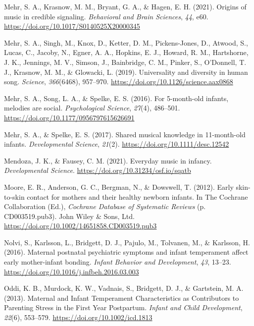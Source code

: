 \documentclass[
]{article}
\newlength{\cslhangindent}
\newenvironment{CSLReferences}[2] %
 {\begin{list}{}{%
  \setlength{\itemindent}{0pt}
  \setlength{\leftmargin}{0pt}
  \setlength{\parsep}{0pt}
  \ifodd #1
   \setlength{\leftmargin}{\cslhangindent}
   \setlength{\itemindent}{-1\cslhangindent}
  \fi
  \setlength{\itemsep}{#2\baselineskip}}}
 {\end{list}}
\begin{document}
\begin{CSLReferences}{1}{0}
Mehr, S. A., Krasnow, M. M., Bryant, G. A., \& Hagen, E. H. (2021).
Origins of music in credible signaling. \emph{Behavioral and Brain
Sciences}, \emph{44}, e60.
\url{https://doi.org/10.1017/S0140525X20000345}

Mehr, S. A., Singh, M., Knox, D., Ketter, D. M., Pickens-Jones, D.,
Atwood, S., Lucas, C., Jacoby, N., Egner, A. A., Hopkins, E. J., Howard,
R. M., Hartshorne, J. K., Jennings, M. V., Simson, J., Bainbridge, C.
M., Pinker, S., O'Donnell, T. J., Krasnow, M. M., \& Glowacki, L.
(2019). Universality and diversity in human song. \emph{Science},
\emph{366}(6468), 957--970.
\url{https://doi.org/10.1126/science.aax0868}

Mehr, S. A., Song, L. A., \& Spelke, E. S. (2016). For 5-month-old
infants, melodies are social. \emph{Psychological Science},
\emph{27}(4), 486--501. \url{https://doi.org/10.1177/0956797615626691}

Mehr, S. A., \& Spelke, E. S. (2017). Shared musical knowledge in
11-month-old infants. \emph{Developmental Science}, \emph{21}(2).
\url{https://doi.org/10.1111/desc.12542}

Mendoza, J. K., \& Fausey, C. M. (2021). Everyday music in infancy.
\emph{Developmental Science}.
\url{https://doi.org/10.31234/osf.io/sqatb}

Moore, E. R., Anderson, G. C., Bergman, N., \& Dowswell, T. (2012).
Early skin-to-skin contact for mothers and their healthy newborn
infants. In The Cochrane Collaboration (Ed.), \emph{Cochrane {Database}
of {Systematic Reviews}} (p. CD003519.pub3). John Wiley \& Sons, Ltd.
\url{https://doi.org/10.1002/14651858.CD003519.pub3}

Nolvi, S., Karlsson, L., Bridgett, D. J., Pajulo, M., Tolvanen, M., \&
Karlsson, H. (2016). Maternal postnatal psychiatric symptoms and infant
temperament affect early mother-infant bonding. \emph{Infant Behavior
and Development}, \emph{43}, 13--23.
\url{https://doi.org/10.1016/j.infbeh.2016.03.003}

Oddi, K. B., Murdock, K. W., Vadnais, S., Bridgett, D. J., \& Gartstein,
M. A. (2013). Maternal and {Infant Temperament Characteristics} as
{Contributors} to {Parenting Stress} in the {First Year Postpartum}.
\emph{Infant and Child Development}, \emph{22}(6), 553--579.
\url{https://doi.org/10.1002/icd.1813}


\end{CSLReferences}
\end{document}

